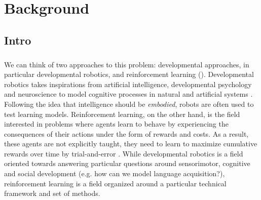 \chapter{Background}

\section{Intro}
\paragraph{}We can think of two approaches to this problem: developmental approaches, in particular developmental robotics, and reinforcement learning (\rl). Developmental robotics takes inspirations from artificial intelligence, developmental psychology and neuroscience to model cognitive processes in natural and artificial systems \citep{asada2009cognitive,cangelosi2015developmental}. Following the idea that intelligence should be \textit{embodied}, robots are often used to test learning models. Reinforcement learning, on the other hand, is the field interested in problems where agents learn to behave by experiencing the consequences of their actions under the form of rewards and costs. As a result, these agents are not explicitly taught, they need to learn to maximize cumulative rewards over time by trial-and-error \citep{sutton2018reinforcement}. While developmental robotics is a field oriented towards answering particular questions around sensorimotor, cognitive and social development (e.g. how can we model language acquisition?), reinforcement learning is a field organized around a particular technical framework and set of methods.

\clearpage
